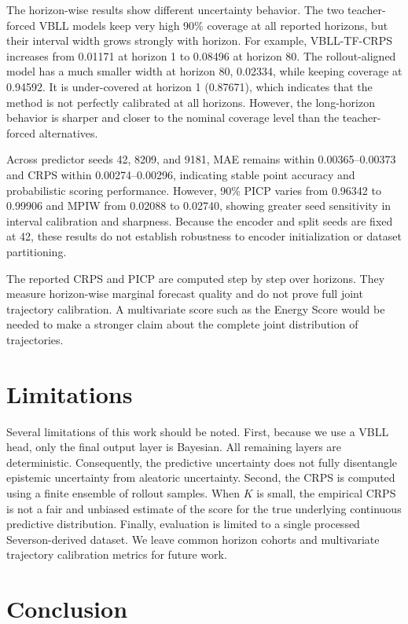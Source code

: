 \documentclass[conference]{IEEEtran}
\begin{document}
The horizon-wise results show different uncertainty behavior. The two
teacher-forced VBLL models keep very high 90\% coverage at all reported
horizons, but their interval width grows strongly with horizon. For example,
VBLL-TF-CRPS increases from 0.01171 at horizon 1 to 0.08496 at horizon 80.
The rollout-aligned model has a much smaller width at horizon 80, 0.02334,
while keeping coverage at 0.94592. It is under-covered at horizon 1
(0.87671), which indicates that the method is not perfectly calibrated at all
horizons. However, the long-horizon behavior is sharper and closer to the
nominal coverage level than the teacher-forced alternatives.

Across predictor seeds 42, 8209, and 9181, MAE remains within
0.00365--0.00373 and CRPS within 0.00274--0.00296, indicating stable point
accuracy and probabilistic scoring performance. However, 90\% PICP varies from
0.96342 to 0.99906 and MPIW from 0.02088 to 0.02740, showing greater seed
sensitivity in interval calibration and sharpness. Because the encoder and
split seeds are fixed at 42, these results do not establish robustness to
encoder initialization or dataset partitioning.

The reported CRPS and PICP are computed step by step over horizons. They
measure horizon-wise marginal forecast quality and do not prove full joint
trajectory calibration. A multivariate score such as the Energy Score would be
needed to make a stronger claim about the complete joint distribution of
trajectories.

\section{Limitations}

Several limitations of this work should be noted. First, because we use a VBLL
head, only the final output layer is Bayesian. All remaining layers are
deterministic. Consequently, the
predictive uncertainty does not fully disentangle epistemic uncertainty from
aleatoric uncertainty. Second, the CRPS is computed using a finite ensemble of
rollout samples. When $K$ is small, the empirical CRPS is not a fair and
unbiased estimate of the score for the true underlying continuous predictive
distribution. Finally, evaluation is limited to a single processed
Severson-derived dataset. We leave common horizon cohorts and multivariate
trajectory calibration metrics for future work.

\section{Conclusion}
\end{document}
